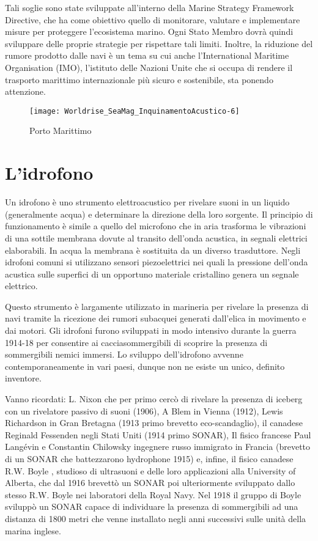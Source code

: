 Tali soglie sono state sviluppate all’interno della Marine Strategy Framework Directive, che ha come obiettivo quello di monitorare, valutare e implementare misure per proteggere l’ecosistema marino. 
Ogni Stato Membro dovrà quindi sviluppare delle proprie strategie per rispettare tali limiti. 
Inoltre, la riduzione del rumore prodotto dalle navi è un tema su cui anche l’International Maritime Organisation (IMO), l’istituto delle Nazioni Unite che si occupa di rendere il trasporto marittimo internazionale più sicuro e sostenibile, sta ponendo attenzione.

\begin{figure}[h]
\centering
\texttt{[image: Worldrise\_SeaMag\_InquinamentoAcustico-6]}
\caption{Porto Marittimo}
\end{figure}

\section{L'idrofono}

Un idrofono è uno strumento elettroacustico per rivelare suoni in un liquido (generalmente acqua) e determinare la direzione della loro sorgente. 
Il principio di funzionamento è simile a quello del microfono che in aria trasforma le vibrazioni di una sottile membrana dovute al transito dell’onda acustica, in segnali elettrici elaborabili. 
In acqua la membrana è sostituita da un diverso trasduttore. 
Negli idrofoni comuni si utilizzano sensori piezoelettrici nei quali la pressione dell’onda acustica sulle superfici di un opportuno materiale cristallino genera un segnale elettrico.

Questo strumento è largamente utilizzato in marineria per rivelare la presenza di navi tramite la ricezione dei rumori subacquei generati dall'elica in movimento e dai motori. 
Gli idrofoni furono sviluppati in modo intensivo durante la guerra 1914-18 per consentire ai cacciasommergibili di scoprire la presenza di sommergibili nemici immersi. 
Lo sviluppo dell’idrofono avvenne contemporaneamente in vari paesi, dunque non ne esiste un unico, definito inventore. 

Vanno ricordati: L. Nixon che per primo cercò di rivelare la presenza di iceberg con un rivelatore passivo di suoni (1906), A Blem in Vienna (1912), Lewis Richardson in Gran Bretagna (1913 primo brevetto eco-scandaglio), il canadese Reginald Fessenden negli Stati Uniti (1914 primo SONAR), Il fisico francese Paul Langévin e Constantin Chilowsky ingegnere russo immigrato in Francia (brevetto di un SONAR che battezzarono hydrophone 1915) e, infine, il fisico canadese R.W. Boyle , studioso di ultrasuoni e delle loro applicazioni alla University of Alberta, che dal 1916 brevettò un SONAR poi ulteriormente sviluppato dallo stesso R.W. Boyle nei laboratori della Royal Navy. 
Nel 1918 il gruppo di Boyle sviluppò un SONAR capace di individuare la presenza di sommergibili ad una distanza di 1800 metri che venne installato negli anni successivi sulle unità della marina inglese.

